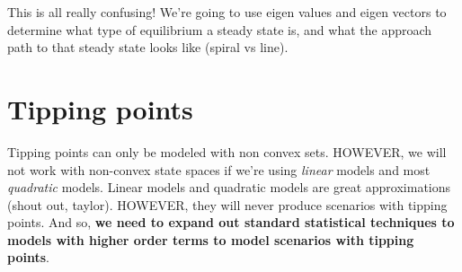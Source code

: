 \documentclass{article}
\begin{document}
This is all really confusing! We're going to use eigen values and eigen vectors to determine what type of equilibrium a steady state is, and what the approach path to that steady state looks like (spiral vs line). 

\section{Tipping points}

Tipping points can only be modeled with non convex sets. HOWEVER, we will not work with non-convex state spaces if we're using \textit{linear} models and most \textit{quadratic} models. Linear models and quadratic models are great approximations (shout out, taylor). HOWEVER, they will never produce scenarios with tipping points. And so, \textbf{we need to expand out standard statistical techniques to models with higher order terms to model scenarios with tipping points}. 
\end{document}
